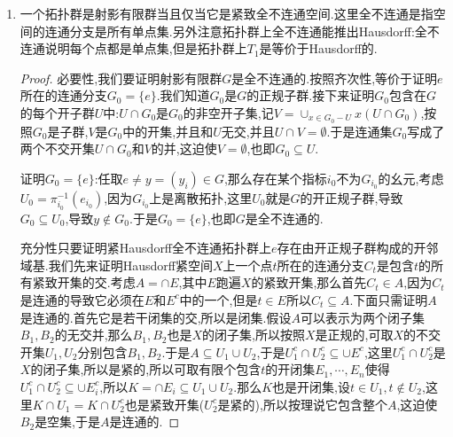 \begin{enumerate}
\begin{proof}
		对$I$的有限子集$S$,记$U_S=\prod_{i\not\in S}G_i\times\prod_{i\in S}\{1_{G_i}\}$,这是$\prod_{i\in I}G_i$的基元素.我们有$f^{-1}(U_S\cap\lim\limits_{\leftarrow}G_i)=\cap_{i\in S}N_i$,这表明$f$是连续映射.
		
		按照$G$是紧空间,它的闭子集都是紧集,紧集的连续像是紧集,而$\lim\limits_{\leftarrow}G_i$是Hausdorff空间,它的紧子集都是闭子集,这说明$f$是闭映射.于是一旦我们证明$f$是满射,它就是同构和同胚.
		
		只需证明$f(G)$是$\lim\limits_{\leftarrow}G_i$的稠密子集.任取$x=(x_i)_{i\in I}\in\lim\limits_{\leftarrow}G_i$,那么$x(U_S\cap\lim\limits_{\leftarrow}G_i)$是$x$的开邻域基,记$N_k=\cap_{i\in S}N_i$,设$y\in G$使得它在典范映射$G\to G/N_k$下的像是$x$的指标$k$的分量$x_k$,这导致$y(\mathrm{mod}N_i)=x_i,\forall i\in S$,导致$f(y)\in x(U_S\cap \lim\limits_{\leftarrow}G_i)$,这说明$f(G)$在$\lim\limits_{\leftarrow}G_i$中稠密.
	\end{proof}
    \item 一个拓扑群是射影有限群当且仅当它是紧致全不连通空间.这里全不连通是指空间的连通分支是所有单点集.另外注意拓扑群上全不连通能推出Hausdorff:全不连通说明每个点都是单点集,但是拓扑群上$T_1$是等价于Hausdorff的.
    \begin{proof}
    	
    	必要性,我们要证明射影有限群$G$是全不连通的.按照齐次性,等价于证明$e$所在的连通分支$G_0=\{e\}$.我们知道$G_0$是$G$的正规子群.接下来证明$G_0$包含在$G$的每个开子群$U$中:$U\cap G_0$是$G_0$的非空开子集,记$V=\cup_{x\in G_0-U}x(U\cap G_0)$,按照$G_0$是子群,$V$是$G_0$中的开集,并且和$U$无交,并且$U\cap V=\emptyset$.于是连通集$G_0$写成了两个不交开集$U\cap G_0$和$V$的并,这迫使$V=\emptyset$,也即$G_0\subseteq U$.
    	
    	\qquad
    	
    	证明$G_0=\{e\}$:任取$e\not=y=(y_i)\in G$,那么存在某个指标$i_0$不为$G_{i_0}$的幺元,考虑$U_0=\pi_{i_0}^{-1}(e_{i_0})$,因为$G_{i_0}$上是离散拓扑,这里$U_0$就是$G$的开正规子群,导致$G_0\subseteq U_0$,导致$y\not\in G_0$.于是$G_0=\{e\}$,也即$G$是全不连通的.
    	
    	\qquad
    	
    	充分性只要证明紧Hausdorff全不连通拓扑群上$e$存在由开正规子群构成的开邻域基.我们先来证明Hausdorff紧空间$X$上一个点$t$所在的连通分支$C_t$是包含$t$的所有紧致开集的交.考虑$A=\cap E$,其中$E$跑遍$X$的紧致开集,那么首先$C_t\in A$,因为$C_t$是连通的导致它必须在$E$和$E^c$中的一个,但是$t\in E$所以$C_t\subseteq A$.下面只需证明$A$是连通的.首先它是若干闭集的交,所以是闭集.假设$A$可以表示为两个闭子集$B_1,B_2$的无交并,那么$B_1,B_2$也是$X$的闭子集,所以按照$X$是正规的,可取$X$的不交开集$U_1,U_2$分别包含$B_1,B_2$.于是$A\subseteq U_1\cup U_2$,于是$U_1^c\cap U_2^c\subseteq\cup E^c$,这里$U_1^c\cap U_2^c$是$X$的闭子集,所以是紧的,所以可取有限个包含$t$的开闭集$E_1,\cdots,E_n$使得$U_1^c\cap U_2^c\subseteq\cup E_i^c$,所以$K=\cap E_i\subseteq U_1\cup U_2$.那么$K$也是开闭集,设$t\in U_1,t\not\in U_2$,这里$K\cap U_1=K\cap U_2^c$也是紧致开集($U_2^c$是紧的),所以按理说它包含整个$A$,这迫使$B_2$是空集,于是$A$是连通的.
    	

\end{proof}
\end{enumerate}
